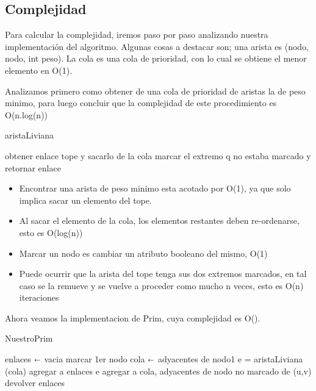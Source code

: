 \subsection{Complejidad}

Para calcular la complejidad, iremos paso por paso analizando nuestra implementación del algoritmo. Algunas cosas a destacar son; una arista es (nodo, nodo, int peso). La cola es una cola de prioridad, con lo cual se obtiene el menor elemento en O(1).


Analizamos primero como obtener de una cola de prioridad de aristas la de peso minimo, para luego concluir que la complejidad de este procedimiento es O(n.log(n))

\begin{algorithm}[H]
\caption{aristaLiviana}\label{ej2}
\begin{algorithmic}[1]
		\State obtener enlace tope y sacarlo de la cola 
			\State marcar el extremo q no estaba marcado y retornar enlace
		\EndIf
	\EndWhile
\EndProcedure
\end{algorithmic}
\end{algorithm}


\begin{itemize}
\item Encontrar una arista de peso minimo esta acotado por O(1), ya que solo implica sacar un elemento del tope.
\item Al sacar el elemento de la cola, los elementos restantes deben re-ordenarse, esto es O(log(n))
\item Marcar un nodo es cambiar un atributo booleano del mismo, O(1)
\item Puede ocurrir que la arista del tope tenga sus dos extremos marcados, en tal caso se la remueve y se vuelve a proceder como mucho n veces, esto es O(n) iteraciones
\end{itemize}  


Ahora veamos la implementacion de Prim, cuya complejidad es O().

\begin{algorithm}[H]
\caption{NuestroPrim}\label{ej2}
\begin{algorithmic}[1]
	\State enlaces $\shortleftarrow$ vacia 
	\State marcar 1er nodo
	\State cola $\shortleftarrow$ adyacentes de nodo1
		\State e = aristaLiviana (cola)
		\State agregar a enlaces e
		\State agregar a cola, adyacentes de nodo no marcado de (u,v)
	\EndWhile
	\State devolver enlaces
\EndProcedure
\end{algorithmic}
\end{algorithm}


